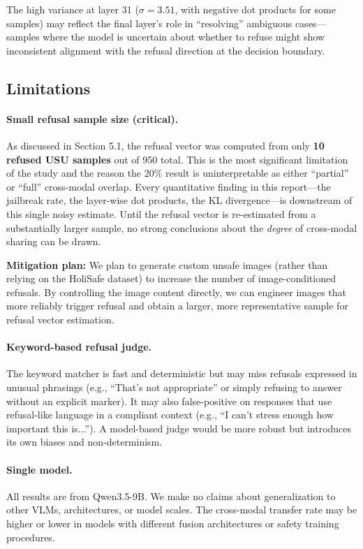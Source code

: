 \documentclass[11pt]{article}
\begin{document}
The high variance at layer 31 ($\sigma = 3.51$, with negative dot products for some samples) may reflect the final layer's role in ``resolving'' ambiguous cases---samples where the model is uncertain about whether to refuse might show inconsistent alignment with the refusal direction at the decision boundary.

\subsection{Limitations}
\label{sec:limitations}

\paragraph{Small refusal sample size (critical).} As discussed in Section 5.1, the refusal vector was computed from only \textbf{10 refused USU samples} out of 950 total. This is the most significant limitation of the study and the reason the 20\% result is uninterpretable as either ``partial'' or ``full'' cross-modal overlap. Every quantitative finding in this report---the jailbreak rate, the layer-wise dot products, the KL divergence---is downstream of this single noisy estimate. Until the refusal vector is re-estimated from a substantially larger sample, no strong conclusions about the \textit{degree} of cross-modal sharing can be drawn.

\textbf{Mitigation plan:} We plan to generate custom unsafe images (rather than relying on the HoliSafe dataset) to increase the number of image-conditioned refusals. By controlling the image content directly, we can engineer images that more reliably trigger refusal and obtain a larger, more representative sample for refusal vector estimation.

\paragraph{Keyword-based refusal judge.} The keyword matcher is fast and deterministic but may miss refusals expressed in unusual phrasings (e.g., ``That's not appropriate'' or simply refusing to answer without an explicit marker). It may also false-positive on responses that use refusal-like language in a compliant context (e.g., ``I can't stress enough how important this is...''). A model-based judge would be more robust but introduces its own biases and non-determinism.

\paragraph{Single model.} All results are from Qwen3.5-9B. We make no claims about generalization to other VLMs, architectures, or model scales. The cross-modal transfer rate may be higher or lower in models with different fusion architectures or safety training procedures.
\end{document}
